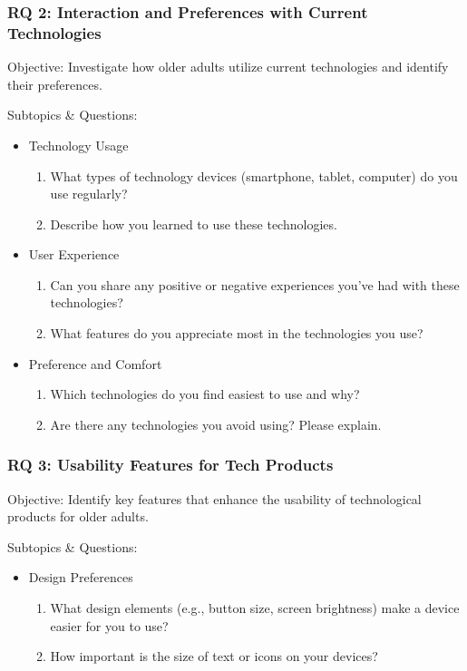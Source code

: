 \documentclass[acmlarge]{acmart}
\begin{document}
{\subsubsection{RQ 2: Interaction and Preferences with Current Technologies}
Objective: Investigate how older adults utilize current technologies and identify their preferences.

Subtopics \& Questions:
\begin{itemize}
    \item Technology Usage
    \begin{enumerate}
        \item What types of technology devices (smartphone, tablet, computer) do you use regularly?
        \item Describe how you learned to use these technologies.
    \end{enumerate}
    
    \item User Experience
    \begin{enumerate}
        \item Can you share any positive or negative experiences you’ve had with these technologies?
        \item What features do you appreciate most in the technologies you use?
    \end{enumerate}
    
    \item Preference and Comfort
    \begin{enumerate}
        \item Which technologies do you find easiest to use and why?
        \item Are there any technologies you avoid using? Please explain.
    \end{enumerate}
\end{itemize}

\subsubsection{RQ 3: Usability Features for Tech Products}
Objective: Identify key features that enhance the usability of technological products for older adults.

Subtopics \& Questions:
\begin{itemize}
    \item Design Preferences
    \begin{enumerate}
        \item What design elements (e.g., button size, screen brightness) make a device easier for you to use?
        \item How important is the size of text or icons on your devices?
    \end{enumerate}
    

\end{itemize}}
\end{document}
